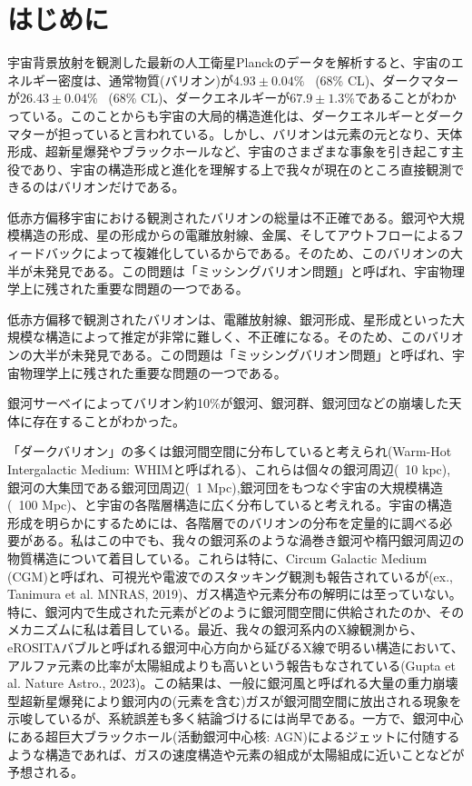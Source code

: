 \chapter{はじめに}

宇宙背景放射を観測した最新の人工衛星Planckのデータを解析すると、宇宙のエネルギー密度は、通常物質(バリオン)が$4.93\pm0.04\%$ \ (68\% CL)、ダークマターが$26.43\pm0.04$\% \ (68\% CL)、ダークエネルギーが$67.9\pm1.3$\%であることがわかっている\citep{aghanim_planck_2020}。このことからも宇宙の大局的構造進化は、ダークエネルギーとダークマターが担っていると言われている。しかし、バリオンは元素の元となり、天体形成、超新星爆発やブラックホールなど、宇宙のさまざまな事象を引き起こす主役であり、宇宙の構造形成と進化を理解する上で我々が現在のところ直接観測できるのはバリオンだけである。


低赤方偏移宇宙における観測されたバリオンの総量は不正確である。銀河や大規模構造の形成、星の形成からの電離放射線、金属、そしてアウトフローによるフィードバックによって複雑化しているからである\citep{shull_baryon_2012}。そのため、このバリオンの大半が未発見である。この問題は「ミッシングバリオン問題」と呼ばれ、宇宙物理学上に残された重要な問題の一つである。

低赤方偏移で観測されたバリオンは、電離放射線、銀河形成、星形成といった大規模な構造によって推定が非常に難しく、不正確になる。そのため、このバリオンの大半が未発見である。この問題は「ミッシングバリオン問題」と呼ばれ、宇宙物理学上に残された重要な問題の一つである。

銀河サーベイによってバリオン約10\%が銀河、銀河群、銀河団などの崩壊した天体に存在することがわかった。


「ダークバリオン」の多くは銀河間空間に分布していると考えられ(Warm-Hot Intergalactic Medium: WHIMと呼ばれる)、これらは個々の銀河周辺(~10 kpc), 銀河の大集団である銀河団周辺(~1 Mpc),銀河団をもつなぐ宇宙の大規模構造(~100 Mpc)、と宇宙の各階層構造に広く分布していると考えれる。宇宙の構造形成を明らかにするためには、各階層でのバリオンの分布を定量的に調べる必要がある。私はこの中でも、我々の銀河系のような渦巻き銀河や楕円銀河周辺の物質構造について着目している。これらは特に、Circum Galactic Medium (CGM)と呼ばれ、可視光や電波でのスタッキング観測も報告されているが(ex., Tanimura et al. MNRAS, 2019)、ガス構造や元素分布の解明には至っていない。特に、銀河内で生成された元素がどのように銀河間空間に供給されたのか、そのメカニズムに私は着目している。最近、我々の銀河系内のX線観測から、eROSITAバブルと呼ばれる銀河中心方向から延びるX線で明るい構造において、アルファ元素の比率が太陽組成よりも高いという報告もなされている(Gupta et al. Nature Astro., 2023)。この結果は、一般に銀河風と呼ばれる大量の重力崩壊型超新星爆発により銀河内の(元素を含む)ガスが銀河間空間に放出される現象を示唆しているが、系統誤差も多く結論づけるには尚早である。一方で、銀河中心にある超巨大ブラックホール(活動銀河中心核: AGN)によるジェットに付随するような構造であれば、ガスの速度構造や元素の組成が太陽組成に近いことなどが予想される。

